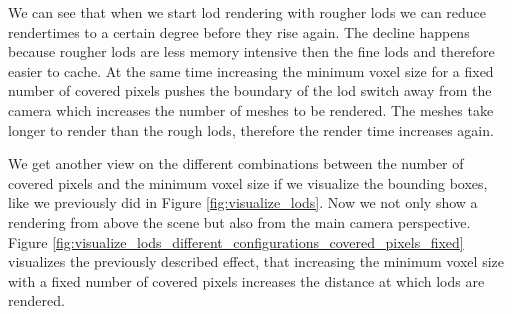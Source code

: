 We can see that when we start \ac{lod} rendering with rougher \acsp{lod} we can reduce rendertimes to a certain degree before they rise again.
The decline happens because rougher \acsp{lod} are less memory intensive then the fine \acsp{lod} and therefore easier to cache.
At the same time increasing the minimum voxel size for a fixed number of covered pixels pushes the boundary of the \ac{lod} switch away from the camera which increases the number of meshes to be rendered.
The meshes take longer to render than the rough \acsp{lod}, therefore the render time increases again.

We get another view on the different combinations between the number of covered pixels and the minimum voxel size if we visualize the bounding boxes, like we previously did in Figure \ref{fig:visualize_lods}.
Now we not only show a rendering from above the scene but also from the main camera perspective.
Figure \ref{fig:visualize_lods_different_configurations_covered_pixels_fixed} visualizes the previously described effect, that increasing the minimum voxel size with a fixed number of covered pixels increases the distance at which \acsp{lod} are rendered.
